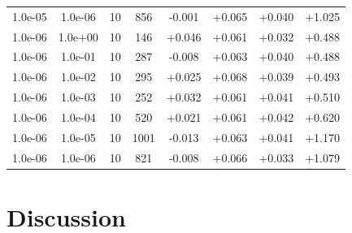 \documentclass[11pt,a4paper]{article}
\begin{document}
\begin{table}
{\begin{tabular}{*{8}c}
\rowcolor{red} 1.0e-05 	 & 1.0e-06 	 & 10 & 856 	 & -0.001 & +0.065 & +0.040 & +1.025 \\ 
 1.0e-06 	 & 1.0e+00 	 & 10 & 146 	 & +0.046 & +0.061 & +0.032 & +0.488 \\ 
 1.0e-06 	 & 1.0e-01 	 & 10 & 287 	 & -0.008 & +0.063 & +0.040 & +0.488 \\ 
 1.0e-06 	 & 1.0e-02 	 & 10 & 295 	 & +0.025 & +0.068 & +0.039 & +0.493 \\ 
 1.0e-06 	 & 1.0e-03 	 & 10 & 252 	 & +0.032 & +0.061 & +0.041 & +0.510 \\ 
 1.0e-06 	 & 1.0e-04 	 & 10 & 520 	 & +0.021 & +0.061 & +0.042 & +0.620 \\ 
\rowcolor{red} 1.0e-06 	 & 1.0e-05 	 & 10 & 1001 	 & -0.013 & +0.063 & +0.041 & +1.170 \\ 
 \rowcolor{red}1.0e-06 	 & 1.0e-06 	 & 10 & 821 	 & -0.008 & +0.066 & +0.033 & +1.079 \\ 
\end{tabular}}
\label{Tab::1}
\end{table} 
%
%
%
%
\section{Discussion}
\end{document}
